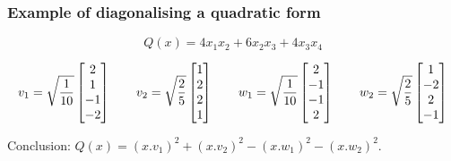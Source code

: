 \documentclass[9pt]{beamer}
\begin{document}
\begin{frame}[t]
 \frametitle{Example of diagonalising a quadratic form}
 \[ Q(x)=4x_1x_2+6x_2x_3+4x_3x_4 \]

 \[ v_1 = \sqrt{\frac{1}{10}} \left[\begin{matrix}  2 \\  1 \\ -1 \\ -2 \end{matrix}\right] \qquad
    v_2 = \sqrt{\frac{2}{5}}  \left[\begin{matrix}  1 \\  2 \\  2 \\  1 \end{matrix}\right] \qquad
    w_1 = \sqrt{\frac{1}{10}} \left[\begin{matrix}  2 \\ -1 \\ -1 \\  2 \end{matrix}\right] \qquad
    w_2 = \sqrt{\frac{2}{5}}  \left[\begin{matrix}  1 \\ -2 \\  2 \\ -1 \end{matrix}\right] 
 \]

 Conclusion:
 $Q(x) = (x.v_1)^2 + (x.v_2)^2 - (x.w_1)^2 - (x.w_2)^2$.
\end{frame}
\end{document}
